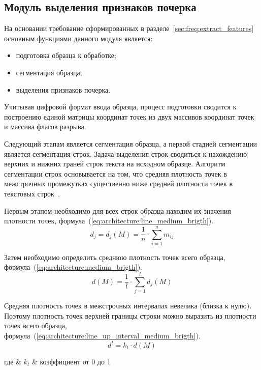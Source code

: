 \subsection{Модуль выделения признаков почерка}
\label{sec:architecture:feature_extraction}
На основании требование сформированных в разделе~\ref{sec:freq:extract_features} основным функциями данного модуля является:
\begin{itemize}
  \item подготовка образца к обработке;
  \item сегментация образца;
  \item выделения признаков почерка.
\end{itemize}

Учитывая цифровой формат ввода образца, процесс подготовки сводится к построению единой матрицы координат точек из двух массивов координат точек и массива флагов разрыва.

Следующий этапам является сегментация образца, а первой стадией сегментации является сегментация строк.
Задача выделения строк сводиться к нахождению верхних и нижних граней строк текста на исходном образце. Алгоритм сегментации строк основывается на том, что средняя плотность точек в межстрочных промежутках существенно ниже средней плотности точек в текстовых строк~\cite{cv_text_image_segmentator}.

Первым этапом необходимо для всех строк образца находим их значения плотности точек, формула~(\ref{eq:architecture:line_medium_brigth}).
\begin{equation}
  \label{eq:architecture:line_medium_brigth}
  d_j = d_j(M) = \frac{1}{n}\cdot\sum\limits_{i=1}^{n} m_{ij}
\end{equation}

Затем необходимо определить среднюю плотность точек всего образца, \mbox{формула~(\ref{eq:architecture:medium_brigth}).}
\begin{equation}
  \label{eq:architecture:medium_brigth}
  d(M) = \frac{1}{l}\cdot\sum\limits_{j=1}^{l} d_j(M)
\end{equation}

Средняя плотность точек в межстрочных интервалах невелика (близка к нулю). Поэтому плотность точек верхней границы строки можно выразить из плотности точек всего образца, формула~(\ref{eq:architecture:line_up_interval_medium_brigth}).
\begin{equation}
  \label{eq:architecture:line_up_interval_medium_brigth}
  d^{t} = k_{t} \cdot d(M)
\end{equation}
\begin{explanation}
где & $ k_{t} $ & коэффициент от 0 до 1
\end{explanation}

